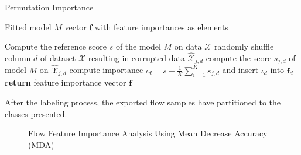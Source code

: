 \documentclass[../../main.tex]{subfiles}
\begin{document}
\begin{algorithm}[H]
    \caption{Permutation Importance}
    \label{alg:permutation_importance}
    \begin{algorithmic}[1]
        \REQUIRE Fitted model $M$
        \ENSURE vector $\bm{f}$ with feature importances as elements

        \STATE Compute the reference score $s$ of the model $M$ on data $\mathcal{X}$
                \STATE randomly shuffle column $d$ of dataset $\mathcal{X}$ resulting in corrupted data $\hat{\mathcal{X}}_{j,d}$
                \STATE compute the score $s_{j,d}$ of model $M$ on $\hat{\mathcal{X}}_{j,d}$
            \ENDFOR
            \STATE compute importance $\iota_d = s - \frac{1}{K} \sum\limits^K_{i=1} s_{j,d}$ and insert $\iota_d$ into $\bm{f}_d$
        \ENDFOR
        \STATE \textbf{return} feature importance vector $\bm{f}$
    \end{algorithmic}
 \end{algorithm}

 \begin{table}[H]
    \footnotesize
    \centering
    \setlength{\extrarowheight}{0pt}
    \addtolength{\extrarowheight}{\aboverulesep}
    \addtolength{\extrarowheight}{\belowrulesep}
    \setlength{\aboverulesep}{0pt}
    \setlength{\belowrulesep}{0pt}
    \setlength{\extrarowheight}{.1em}
     
    \caption[Preprocessed Flows]{After the labeling process, the exported flow samples have partitioned to the classes presented.}
    \label{tab:preprocessed_flows}
\end{table}

\begin{figure}[H]
    \centering
    
    \caption[Flow Feature Importance Analysis]{Flow Feature Importance Analysis Using Mean Decrease Accuracy (MDA)}
    \label{fig:feature_importances}
\end{figure}
\end{document}
